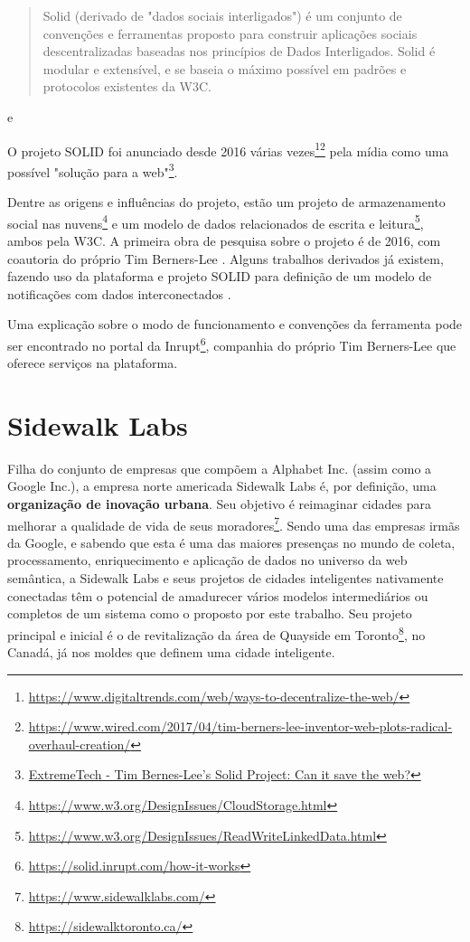 \begin{quote}
    Solid (derivado de "dados sociais interligados") é um conjunto de convenções e ferramentas proposto para construir aplicações sociais descentralizadas baseadas nos princípios de Dados Interligados. Solid é modular e extensível, e se baseia o máximo possível em padrões e protocolos existentes da W3C.
\end{quote}e

O projeto SOLID foi anunciado desde 2016 várias vezes\footnote{\url{https://www.digitaltrends.com/web/ways-to-decentralize-the-web/}}\footnote{\url{https://www.wired.com/2017/04/tim-berners-lee-inventor-web-plots-radical-overhaul-creation/}} pela mídia como uma possível "solução para a web"\footnote{\href{https://www.extremetech.com/extreme/281334-tim-berners-lees-solid-project-can-it-save-the-web}{ExtremeTech - Tim Bernes-Lee's Solid Project: Can it save the web?}}.

Dentre as origens e influências do projeto, estão um projeto de armazenamento social nas nuvens\footnote{\url{https://www.w3.org/DesignIssues/CloudStorage.html}} e um modelo de dados relacionados de escrita e leitura\footnote{\url{https://www.w3.org/DesignIssues/ReadWriteLinkedData.html}}, ambos pela W3C. A primeira obra de pesquisa sobre o projeto é de 2016, com coautoria do próprio Tim Berners-Lee \cite{mansour2016demonstration}. Alguns trabalhos derivados já existem, fazendo uso da plataforma e projeto SOLID para definição de um modelo de notificações com dados interconectados \cite{capadisli2017linked}.

Uma explicação sobre o modo de funcionamento e convenções da ferramenta pode ser encontrado no portal da Inrupt\footnote{\url{https://solid.inrupt.com/how-it-works}}, companhia do próprio Tim Berners-Lee que oferece serviços na plataforma.

\section{Sidewalk Labs}

Filha do conjunto de empresas que compõem a Alphabet Inc. (assim como a Google Inc.), a empresa norte americada Sidewalk Labs é, por definição, uma \textbf{organização de inovação urbana}. Seu objetivo é reimaginar cidades para melhorar a qualidade de vida de seus moradores\footnote{\url{https://www.sidewalklabs.com/}}. Sendo uma das empresas irmãs da Google, e sabendo que esta é uma das maiores presenças no mundo de coleta, processamento, enriquecimento e aplicação de dados no universo da web semântica, a Sidewalk Labs e seus projetos de cidades inteligentes nativamente conectadas têm o potencial de amadurecer vários modelos intermediários ou completos de um sistema como o proposto por este trabalho. Seu projeto principal e inicial é o de revitalização da área de Quayside em Toronto\footnote{\url{https://sidewalktoronto.ca/}}, no Canadá, já nos moldes que definem uma cidade inteligente.

